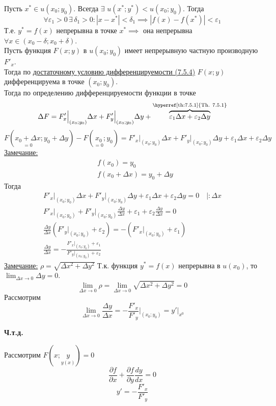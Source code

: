 \documentclass[12pt]{article}
\begin{document}
\begin{adjustwidth}{1.5em}{1.5em}
        Пусть $x^* \in u(x_0; y_0)$. Всегда $\exists$ $u(x^*; y^*) < u(x_0; y_0)$. Тогда
        \[ \forall \varepsilon_1 > 0\, \exists\, \delta_1 > 0 : |x - x^*| < \delta_1 \implies | f(x) - f(x^*)| < \varepsilon_1 \]
        Т.е. $y^* = f(x)$ непрерывна в точке $x^* \implies$ она непрерывна $\forall x \in (x_0 - \delta; x_0 + \delta)$.\\
        Пусть функция $F(x; y)$ в $u(x_0; y_0)$ имеет непрерывную частную производную $F'_x$.\\
        Тогда по \hyperref[th:7.5.4]{достаточному условию дифференцируемости (7.5.4)} $F(x; y)$ дифференцируема в точке $(x_0; y_0)$.\\
        Тогда по определению дифференцируемости функции в точке
        \[ \Delta F = F'_x \Big|_{(x_0; y_0)} \Delta x + F'_y \Big|_{(x_0; y_0)} \Delta y + \overbrace{\varepsilon_1 \Delta x + \varepsilon_2 \Delta y}^{\text{\hyperref[th:7.5.1]{Th. 7.5.1}}} \]
        \[ F(\underset{=0}{x_0 + \Delta x}; y_0 + \Delta y) - F(\underset{=0}{x_0}; y_0) = F'_x \Big|_{(x_0; y_0)} \Delta x + F'_y \Big|_{(x_0; y_0)} \Delta y + \varepsilon_1 \Delta x + \varepsilon_2 \Delta y \]
        \underline{Замечание:} 
        \[ \begin{aligned}
            &f(x_0) = y_0\\
            &f(x_0 + \Delta x) = y_0 + \Delta y
        \end{aligned} \]
        Тогда
        \begin{gather*}
            F'_x \Big|_{(x_0; y_0)} \Delta x + F'_y \Big|_{(x_0; y_0)} \Delta y + \varepsilon_1 \Delta x + \varepsilon_2 \Delta y = 0 \quad \Big| : \Delta x\\
            F'_x \Big|_{(x_0; y_0)} + F'_y \Big|_{(x_0; y_0)} \frac{\Delta y}{\Delta x} + \varepsilon_1 + \varepsilon_2 \frac{\Delta y}{\Delta x} = 0\\
            \frac{\Delta y}{\Delta x} \left( F'_y \Big|_{(x_0; y_0)} + \varepsilon_2 \right) = - \left( F'_x \Big|_{(x_0; y_0)} + \varepsilon_1 \right)\\
            \frac{\Delta y}{\Delta x} = - \frac{F'_x \Big|_{(x_0; y_0)} + \varepsilon_1}{F'_y \Big|_{(x_0; y_0)} + \varepsilon_2}
        \end{gather*}
        \underline{Замечание:} $\rho = \sqrt{\Delta x^2 + \Delta y^2}$
        Т.к. функция $y^* = f(x)$ непрерывна в $u(x_0)$, то $\lim_{\Delta x \to 0} \Delta y = 0$.
        \[
            \lim_{\Delta x \to 0}\rho = \lim_{\Delta x \to 0} \sqrt{\Delta x^2 + \Delta y^2} = 0
        \]
        Рассмотрим
        \[ \lim_{\Delta x \to 0} \frac{\Delta y}{\Delta x} = \boxed{ - \frac{F'_x}{F'_y} \Big|_{(x_0; y_0)} = y' \Big|_{x^0} } \]
        \begin{center}
            \textbf{Ч.т.д.}
        \end{center}
    \end{adjustwidth}
    Рассмотрим $F(x; \underset{y(x)}{y}) = 0$
    \[ \frac{\partial f}{\partial x} + \frac{\partial f}{\partial y} \frac{dy}{dx} = 0 \]
    \[ y' = - \frac{F'_x}{F'_y} \]
\end{document}
